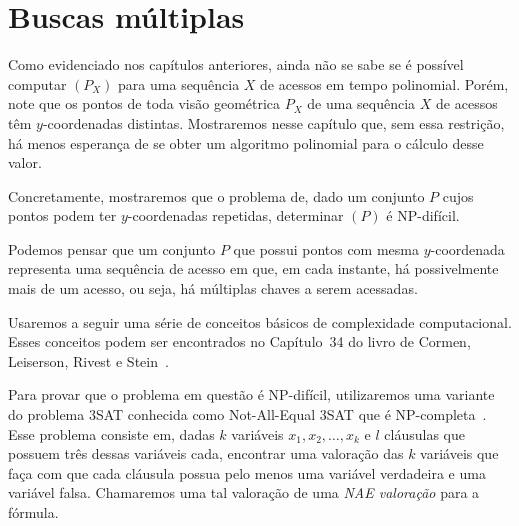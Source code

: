 
\chapter{Buscas múltiplas}
\label{cap:buscas-multiplas}





Como evidenciado nos capítulos anteriores, ainda não se sabe se é possível computar \minASS$(P_X)$ para uma sequência $X$ de acessos em tempo polinomial. Porém, note que os pontos de toda visão geométrica $P_X$ de uma sequência $X$ de acessos têm $y$-coordenadas distintas. Mostraremos nesse capítulo que, sem essa restrição, há menos esperança de se obter um algoritmo polinomial para o cálculo desse valor.

Concretamente, mostraremos que o problema de, dado um conjunto $P$ cujos pontos podem ter $y$-coordenadas repetidas, determinar \minASS$(P)$ é NP-difícil.

Podemos pensar que um conjunto $P$ que possui pontos com mesma $y$-coordenada representa uma sequência de acesso em que, em cada instante, há possivelmente mais de um acesso, ou seja, há múltiplas chaves a serem acessadas.

Usaremos a seguir uma série de conceitos básicos de complexidade computacional. Esses conceitos podem ser encontrados no Capítulo~34 do livro de Cormen, Leiserson, Rivest e Stein~\cite{CLRS}.


Para provar que o problema em questão é NP-difícil, utilizaremos uma variante do problema 3SAT conhecida como Not-All-Equal 3SAT que é NP-completa~\cite{3SATNAE}. %
Esse problema consiste em, dadas $k$ variáveis $x_1, x_2, \ldots, x_k$ e $l$ cláusulas que possuem três dessas variáveis cada, encontrar uma valoração das $k$ variáveis que faça com que cada cláusula possua pelo menos uma variável verdadeira e uma variável falsa. Chamaremos uma tal valoração de uma \textit{NAE valoração} para a fórmula.

